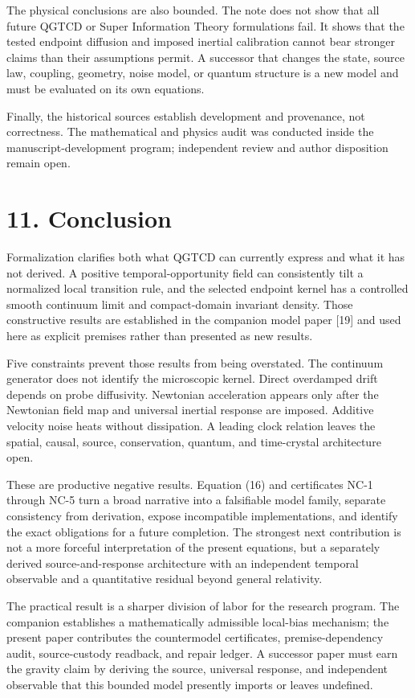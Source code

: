 \documentclass[
  american,
  11pt,
  letterpaper,
]{article}
\begin{document}
The physical conclusions are also bounded. The note does not show that all future QGTCD or Super Information Theory formulations fail. It shows that the tested endpoint diffusion and imposed inertial calibration cannot bear stronger claims than their assumptions permit. A successor that changes the state, source law, coupling, geometry, noise model, or quantum structure is a new model and must be evaluated on its own equations.

Finally, the historical sources establish development and provenance, not correctness. The mathematical and physics audit was conducted inside the manuscript-development program; independent review and author disposition remain open.

\section{11. Conclusion}\label{conclusion}

Formalization clarifies both what QGTCD can currently express and what it has not derived. A positive temporal-opportunity field can consistently tilt a normalized local transition rule, and the selected endpoint kernel has a controlled smooth continuum limit and compact-domain invariant density. Those constructive results are established in the companion model paper {[}19{]} and used here as explicit premises rather than presented as new results.

Five constraints prevent those results from being overstated. The continuum generator does not identify the microscopic kernel. Direct overdamped drift depends on probe diffusivity. Newtonian acceleration appears only after the Newtonian field map and universal inertial response are imposed. Additive velocity noise heats without dissipation. A leading clock relation leaves the spatial, causal, source, conservation, quantum, and time-crystal architecture open.

These are productive negative results. Equation (16) and certificates NC-1 through NC-5 turn a broad narrative into a falsifiable model family, separate consistency from derivation, expose incompatible implementations, and identify the exact obligations for a future completion. The strongest next contribution is not a more forceful interpretation of the present equations, but a separately derived source-and-response architecture with an independent temporal observable and a quantitative residual beyond general relativity.

The practical result is a sharper division of labor for the research program. The companion establishes a mathematically admissible local-bias mechanism; the present paper contributes the countermodel certificates, premise-dependency audit, source-custody readback, and repair ledger. A successor paper must earn the gravity claim by deriving the source, universal response, and independent observable that this bounded model presently imports or leaves undefined.
\end{document}
